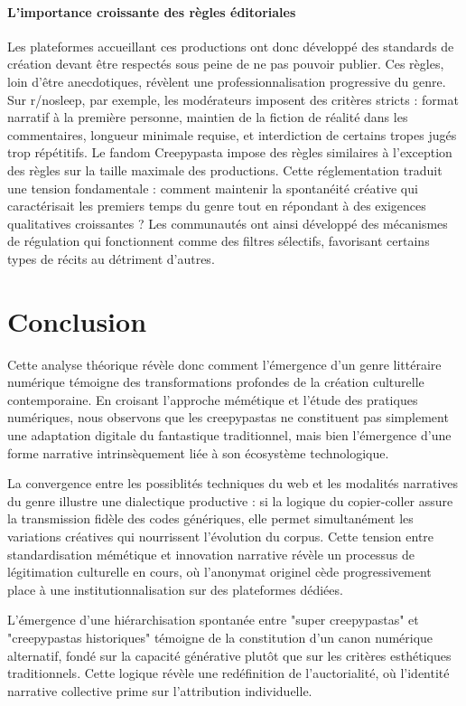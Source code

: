 \documentclass[12pt,a4paper,oneside,titlepage]{book} %
\begin{document}
\subsubsection{L'importance croissante des règles éditoriales}

Les plateformes accueillant ces productions ont donc développé des standards de création devant être respectés sous peine de ne pas pouvoir publier. Ces règles, loin d'être anecdotiques, révèlent une professionnalisation progressive du genre. Sur r/nosleep, par exemple, les modérateurs imposent des critères stricts : format narratif à la première personne, maintien de la fiction de réalité dans les commentaires, longueur minimale requise, et interdiction de certains tropes jugés trop répétitifs. Le fandom Creepypasta impose des règles similaires à l'exception des règles sur la taille maximale des productions.
Cette réglementation traduit une tension fondamentale : comment maintenir la spontanéité créative qui caractérisait les premiers temps du genre tout en répondant à des exigences qualitatives croissantes ? Les communautés ont ainsi développé des mécanismes de régulation qui fonctionnent comme des filtres sélectifs, favorisant certains types de récits au détriment d'autres.


\chapter*{Conclusion}

Cette analyse théorique révèle donc comment l'émergence d'un genre littéraire numérique témoigne des transformations profondes de la création culturelle contemporaine. En croisant l'approche mémétique et l'étude des pratiques numériques, nous observons que les creepypastas ne constituent pas simplement une adaptation digitale du fantastique traditionnel, mais bien l'émergence d'une forme narrative intrinsèquement liée à son écosystème technologique.

La convergence entre les possiblités techniques du web et les modalités narratives du genre illustre une dialectique productive : si la logique du copier-coller assure la transmission fidèle des codes génériques, elle permet simultanément les variations créatives qui nourrissent l'évolution du corpus. Cette tension entre standardisation mémétique et innovation narrative révèle un processus de légitimation culturelle en cours, où l'anonymat originel cède progressivement place à une institutionnalisation sur des plateformes dédiées.

L'émergence d'une hiérarchisation spontanée entre "super creepypastas" et "creepypastas historiques" témoigne de la constitution d'un canon numérique alternatif, fondé sur la capacité générative plutôt que sur les critères esthétiques traditionnels. Cette logique révèle une redéfinition de l'auctorialité, où l'identité narrative collective prime sur l'attribution individuelle.
\end{document}
